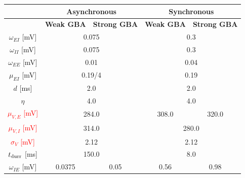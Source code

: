 \begin{table}[!ht]
\centering
\begin{tabular}{c|c|c|c|c|}
\cline{2-5}
\multicolumn{1}{l|}{}                                    & \multicolumn{2}{c|}{\textbf{Asynchronous}} &  \multicolumn{2}{c|}{\textbf{Synchronous}} \\ \hline 
\multicolumn{1}{|c|}{}                                   & \textbf{Weak GBA}   & \textbf{Strong GBA}  & \textbf{Weak GBA}  & \textbf{Strong GBA}  \\ \hline
\multicolumn{1}{|c|}{$\omega_{EI}$ {[}mV{]}}             & \multicolumn{2}{c|}{0.075}                 & \multicolumn{2}{c|}{0.3}                  \\ \hline
\multicolumn{1}{|c|}{$\omega_{II}$ {[}mV{]}}             & \multicolumn{2}{c|}{0.075}                 & \multicolumn{2}{c|}{0.3}                  \\ \hline
\multicolumn{1}{|c|}{$\omega_{EE}$ {[}mV{]}}             & \multicolumn{2}{c|}{0.01}                  & \multicolumn{2}{c|}{0.04}                 \\ \hline
\multicolumn{1}{|c|}{$\mu_{EI}$ {[}mV{]}}                & \multicolumn{2}{c|}{0.19/4}                & \multicolumn{2}{c|}{0.19}                 \\ \hline
\multicolumn{1}{|c|}{$d$ {[}ms{]}}                       & \multicolumn{2}{c|}{2.0}                   & \multicolumn{2}{c|}{2.0}                  \\ \hline
\multicolumn{1}{|c|}{$\eta$}                             & \multicolumn{2}{c|}{4.0}                   & \multicolumn{2}{c|}{4.0}                  \\ \hline
\multicolumn{1}{|c|}{\textcolor{red}{$\mu_{V,E}$ {[}mV{]}}}               & \multicolumn{2}{c|}{284.0}                 & 308.0 & 320.0                \\ \hline
\multicolumn{1}{|c|}{\textcolor{red}{$\mu_{V,I}$ {[}mV{]}}}               & \multicolumn{2}{c|}{314.0}                 & \multicolumn{2}{c|}{280.0}                \\ \hline
\multicolumn{1}{|c|}{\textcolor{red}{$\sigma_V$ {[}mV{]}}}                & \multicolumn{2}{c|}{2.12}                  & \multicolumn{2}{c|}{2.12}                 \\ \hline
\multicolumn{1}{|c|}{$t_{\rm durr} $ {[}ms{]}}           & \multicolumn{2}{c|}{150.0}                 & \multicolumn{2}{c|}{8.0}                  \\ \hline
\multicolumn{1}{|c|}{$\omega_{IE}$ {[}mV{]}}             & 0.0375              & 0.05                 & 0.56               & 0.98                 \\ \hline

\end{tabular}
\end{table}
